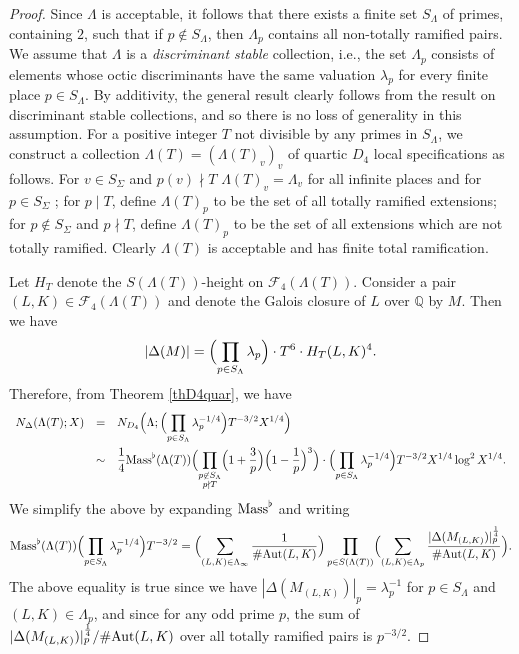 \documentclass[10pt]{article}
\theoremstyle{plain}
\theoremstyle{definition}
\theoremstyle{remark}
\DeclareMathOperator{\Aut}{Aut}
\def\Aut{{\rm Aut}}
\def\Mass{{\rm Mass}}
\def\FF{{\mathcal F}}
\def\bQ{{\mathbb Q}}
\def\bQ{{\mathbb Q}}
\begin{document}
\begin{proof}
Since $\Lambda$ is acceptable, it follows that there exists a finite
set $S_\Lambda$ of primes, containing $2$, such that if $p\not\in
S_\Lambda$, then $\Lambda_p$ contains all non-totally ramified pairs.
We assume that $\Lambda$ is a {\it discriminant stable} collection,
i.e., the set $\Lambda_p$ consists of elements whose octic
discriminants have the same valuation $\lambda_p$ for every finite
place $p\in S_\Lambda$. By additivity, the general result clearly
follows from the result on discriminant stable collections, and so
there is no loss of generality in this assumption.  For a positive
integer $T$ not divisible by any primes in $S_\Lambda$, we construct a
collection $\Lambda(T)=(\Lambda(T)_v)_v$ of quartic $D_4$ local
specifications as follows. For $v\in S_\Sigma$ and $p(v) \nmid T$
$\Lambda(T)_v=\Lambda_v$ for all infinite places and for $p \in S_\Sigma$ ; for $p\mid T$, define $\Lambda(T)_p$ to be
the set of all totally ramified extensions; for $p\not\in S_\Sigma$
and $p\nmid T$, define $\Lambda(T)_p$ to be the set of all extensions
which are not totally ramified. Clearly $\Lambda(T)$ is acceptable and
has finite total ramification.

Let $H_T$ denote the $S(\Lambda(T))$-height on $\FF_4(\Lambda(T))$.
Consider a pair $(L,K)\in\FF_4(\Lambda(T))$ and denote the Galois
closure of $L$ over $\bQ$ by $M$. Then we have
\begin{equation*}
|\Delta(M)|=\Bigl(\prod_{p\in S_\Lambda} \lambda_p\Bigr)\cdot T^6\cdot H_T(L,K)^4.
\end{equation*}
Therefore, from Theorem \ref{thD4quar}, we have
\begin{equation*}
\begin{array}{rcl}
\displaystyle N_\Delta(\Lambda(T);X)&=&
\displaystyle N_{D_4}\Bigl(\Lambda;\Bigl(\prod_{p\in
S_\Lambda} \lambda_p^{-1/4} \Bigr)T^{-3/2}X^{1/4}\Bigr)
\\[.2in]&\sim &\displaystyle
\frac14\Mass^\flat(\Lambda(T))\Bigl(\prod_{\substack{p\not\in S_\Lambda\\p\nmid T}}
\Bigl(1+\frac{3}{p}\Bigr)\Bigl(1-\frac{1}{p}\Bigr)^3\Bigr)\cdot
\Bigl(\prod_{p\in S_\Lambda}\lambda_p^{-1/4}\Bigr)T^{-3/2}X^{1/4}\log^2 X^{1/4}.
\end{array}
\end{equation*}
We simplify the above by expanding $\Mass^\flat$ and writing
\begin{equation*}
\Mass^\flat(\Lambda(T))\Bigl(\prod_{p\in S_\Lambda}\lambda_p^{-1/4}\Bigr)T^{-3/2}
=\Bigl(\sum_{(L,K)\in\Lambda_\infty}\frac{1}{\#\Aut(L,K)}\Bigr)
\prod_{p\in S(\Lambda(T))}\Bigl(\sum_{(L,K)\in\Lambda_p}
\frac{|\Delta(M_{(L,K)})|_p^{\frac14}}{\#\Aut(L,K)}\Bigr).
\end{equation*}
The above equality is true since we have
$|\Delta(M_{(L,K)})|_p=\lambda_p^{-1}$ for $p\in S_\Lambda$ and
$(L,K)\in\Lambda_p$, and since for any odd prime $p$, the sum of
$|\Delta(M_{(L,K)})|_p^{\frac14}/\#\Aut(L,K)$ over all totally
ramified pairs is $p^{-3/2}$.


\end{proof}
\end{document}

